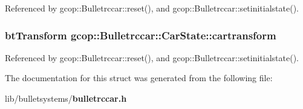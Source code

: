 \-Referenced by gcop\-::\-Bulletrccar\-::reset(), and gcop\-::\-Bulletrccar\-::setinitialstate().

\subsubsection[{cartransform}]{\setlength{\rightskip}{0pt plus 5cm}bt\-Transform {\bf gcop\-::\-Bulletrccar\-::\-Car\-State\-::cartransform}}\label{structgcop_1_1Bulletrccar_1_1CarState_a59ff2b7a8d81a36d91d413e7bfa13b7c}


\-Referenced by gcop\-::\-Bulletrccar\-::reset(), and gcop\-::\-Bulletrccar\-::setinitialstate().



\-The documentation for this struct was generated from the following file\-:\begin{DoxyCompactItemize}
\item 
lib/bulletsystems/{\bf bulletrccar.\-h}\end{DoxyCompactItemize}
